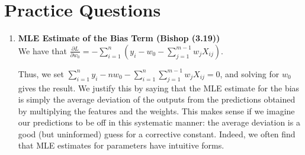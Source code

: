 \documentclass[11pt,letterpaper]{article}
\begin{document}
\section{Practice Questions}
\begin{enumerate}

\item {\bf MLE Estimate of the Bias Term (Bishop (3.19))}\\
We have that $\frac{\partial L}{\partial w_0} = -\sum_{i=1}^n (y_i - w_0 - \sum_{j=1}^{m-1} w_j X_{ij})$. 

Thus, we set $\sum_{i=1}^n y_i - nw_0 - \sum_{i=1}^n \sum_{j=1}^{m-1} w_j X_{ij} = 0$, and solving for $w_0$ gives the result. We justify this by saying that the MLE estimate for the bias is simply the average deviation of the outputs from the predictions obtained by multiplying the features and the weights. This makes sense if we imagine our predictions to be off in this systematic manner: the average deviation is a good (but uninformed) guess for a corrective constant. Indeed, we often find that MLE estimates for parameters have intuitive forms.


\end{enumerate}
\end{document}
